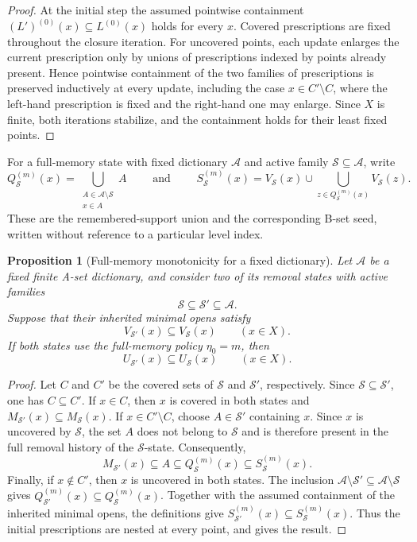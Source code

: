 \documentclass[a4paper,11pt]{article}
\newtheorem{proposition}[proposition]{Proposition}
\theoremstyle{definition}
\theoremstyle{remark}
\begin{document}
\begin{proof}
At the initial step the assumed pointwise containment $(L')^{(0)}(x)\subseteq L^{(0)}(x)$ holds for every $x$. Covered prescriptions are fixed throughout the closure iteration. For uncovered points, each update enlarges the current prescription only by unions of prescriptions indexed by points already present. Hence pointwise containment of the two families of prescriptions is preserved inductively at every update, including the case $x\in C'\setminus C$, where the left-hand prescription is fixed and the right-hand one may enlarge. Since $X$ is finite, both iterations stabilize, and the containment holds for their least fixed points.
\end{proof}

For a full-memory state with fixed dictionary $\mathcal A$ and active family $\mathcal S\subseteq\mathcal A$, write
$$
Q_{\mathcal S}^{(m)}(x)=\bigcup_{\substack{A\in\mathcal A\setminus\mathcal S\\x\in A}}A\qquad \text{ and }\qquad S_{\mathcal S}^{(m)}(x)=V_{\mathcal S}(x)\cup\bigcup_{z\in Q_{\mathcal S}^{(m)}(x)}V_{\mathcal S}(z).
$$
These are the remembered-support union and the corresponding B-set seed, written without reference to a particular level index.

\begin{proposition}[Full-memory monotonicity for a fixed dictionary]
\label{prop:full-memory-refinement-monotone}
Let $\mathcal A$ be a fixed finite A-set dictionary, and consider two of its removal states with active families
$$
\mathcal S\subseteq\mathcal S'\subseteq\mathcal A.
$$
Suppose that their inherited minimal opens satisfy
$$
V_{\mathcal S'}(x)\subseteq V_{\mathcal S}(x)
\qquad(x\in X).
$$
If both states use the full-memory policy $\eta_0=m$, then
$$
U_{\mathcal S'}(x)\subseteq U_{\mathcal S}(x)
\qquad(x\in X).
$$
\end{proposition}

\begin{proof}
Let $C$ and $C'$ be the covered sets of $\mathcal S$ and $\mathcal S'$, respectively. Since $\mathcal S\subseteq\mathcal S'$, one has $C\subseteq C'$. If $x\in C$, then $x$ is covered in both states and $M_{\mathcal S'}(x)\subseteq M_{\mathcal S}(x)$. If $x\in C'\setminus C$, choose $A\in\mathcal S'$ containing $x$. Since $x$ is uncovered by $\mathcal S$, the set $A$ does not belong to $\mathcal S$ and is therefore present in the full removal history of the $\mathcal S$-state. Consequently,
$$
M_{\mathcal S'}(x)
\subseteq A
\subseteq Q_{\mathcal S}^{(m)}(x)
\subseteq S_{\mathcal S}^{(m)}(x).
$$
Finally, if $x\notin C'$, then $x$ is uncovered in both states. The inclusion $\mathcal A\setminus\mathcal S'\subseteq \mathcal A\setminus\mathcal S$ gives $Q_{\mathcal S'}^{(m)}(x)
\subseteq Q_{\mathcal S}^{(m)}(x)$. Together with the assumed containment of the inherited minimal opens, the definitions give $S_{\mathcal S'}^{(m)}(x) \subseteq S_{\mathcal S}^{(m)}(x)$. Thus the initial prescriptions are nested at every point, and  gives the result.
\end{proof}
\end{document}
